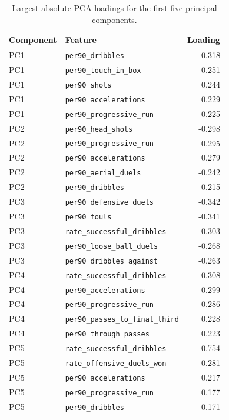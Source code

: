\begin{table}[h]
\centering
\caption{Largest absolute PCA loadings for the first five principal components.}
\label{tab:pca_loadings}
\begin{tabular}{llr}
\toprule
Component & Feature & Loading \\
\midrule
PC1 & \texttt{per90\_dribbles}          &  0.318 \\
PC1 & \texttt{per90\_touch\_in\_box}    &  0.251 \\
PC1 & \texttt{per90\_shots}             &  0.244 \\
PC1 & \texttt{per90\_accelerations}     &  0.229 \\
PC1 & \texttt{per90\_progressive\_run}  &  0.225 \\
\midrule
PC2 & \texttt{per90\_head\_shots}       & -0.298 \\
PC2 & \texttt{per90\_progressive\_run}  &  0.295 \\
PC2 & \texttt{per90\_accelerations}     &  0.279 \\
PC2 & \texttt{per90\_aerial\_duels}     & -0.242 \\
PC2 & \texttt{per90\_dribbles}          &  0.215 \\
\midrule
PC3 & \texttt{per90\_defensive\_duels}      & -0.342 \\
PC3 & \texttt{per90\_fouls}                 & -0.341 \\
PC3 & \texttt{rate\_successful\_dribbles}   &  0.303 \\
PC3 & \texttt{per90\_loose\_ball\_duels}    & -0.268 \\
PC3 & \texttt{per90\_dribbles\_against}     & -0.263 \\
\midrule
PC4 & \texttt{rate\_successful\_dribbles}       &  0.308 \\
PC4 & \texttt{per90\_accelerations}             & -0.299 \\
PC4 & \texttt{per90\_progressive\_run}          & -0.286 \\
PC4 & \texttt{per90\_passes\_to\_final\_third}  &  0.228 \\
PC4 & \texttt{per90\_through\_passes}           &  0.223 \\
\midrule
PC5 & \texttt{rate\_successful\_dribbles}   &  0.754 \\
PC5 & \texttt{rate\_offensive\_duels\_won}  &  0.281 \\
PC5 & \texttt{per90\_accelerations}         &  0.217 \\
PC5 & \texttt{per90\_progressive\_run}      &  0.177 \\
PC5 & \texttt{per90\_dribbles}              &  0.171 \\
\bottomrule
\end{tabular}
\end{table}

